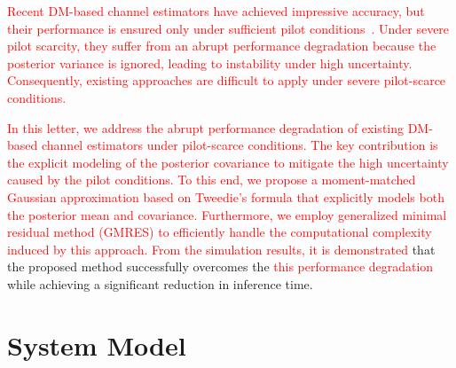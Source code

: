 \documentclass[lettersize,journal]{IEEEtran}
\newcommand{\tred}{\textcolor{red}}
\begin{document}
\tred{Recent DM-based channel estimators have achieved impressive accuracy, but their performance is ensured only under sufficient pilot conditions~\cite{arvinteMIMOChannelEstimation2023,zhouGenerativeDiffusionModels2025}. Under severe pilot scarcity, they suffer from an abrupt performance degradation because the posterior variance is ignored, leading to instability under high uncertainty. Consequently, existing approaches are difficult to apply under severe pilot-scarce conditions.}

\tred{In this letter, we address the abrupt performance degradation of existing DM-based channel estimators under pilot-scarce conditions. The key contribution is the explicit modeling of the posterior covariance to mitigate the high uncertainty caused by the pilot conditions. To this end, we propose a moment-matched Gaussian approximation based on Tweedie's formula that explicitly models both the posterior mean and covariance. Furthermore, we employ generalized minimal residual method (GMRES) to efficiently handle the computational complexity induced by this approach.} \tred{From the simulation results, it is demonstrated} that the proposed method successfully overcomes the \tred{this performance degradation} while achieving a significant reduction in inference time.

\section{System Model}
\end{document}
